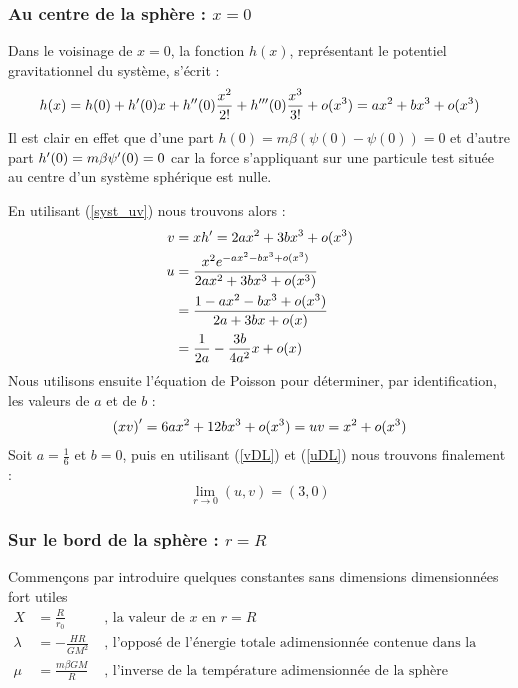 
\subsubsection{Au centre de la sphère : $x = 0$}
	Dans le voisinage de $x=0$, la fonction $h(x)$, représentant le potentiel gravitationnel du système, s'écrit :
	\begin{align*}
		h(x) = h(0) + h'(0)x + h^{\prime\prime}(0)\frac{x^2}{2!} + h^{\prime\prime\prime}(0)\frac{x^3}{3!} + o(x^3) = ax^2 + bx^3 + o(x^3)
	\end{align*}
	Il est clair en effet que d'une part \mbox{$h(0) = m\beta\left(\psi(0) - \psi(0)\right) = 0$} et d'autre part \mbox{$h'(0) = m\beta\psi'(0) = 0$} car la force s'appliquant sur une particule test située au centre d'un système sphérique est nulle.

	En utilisant (\ref{syst_uv}) nous trouvons alors :
	\begin{align}
		v &= xh' = 2ax^2 + 3bx^3 + o(x^3)\label{vDL} \\
		u &= \frac{x^2e^{-ax^2 - bx^3 + o(x^3)}}{2ax^2 + 3bx^3 + o(x^3)} \\
		  &= \frac{1 - ax^2 - bx^3 + o(x^3)}{2a + 3bx +o(x)} \\
		  &= \frac{1}{2a} - \frac{3b}{4a^2}x + o(x)\label{uDL}
	\end{align}
	Nous utilisons ensuite l'équation de Poisson pour déterminer, par identification, les valeurs de $a$ et de $b$ :
	\begin{align}
		\left(xv\right)' = 6ax^2 + 12bx^3 + o(x^3) = uv = x^2 + o(x^3)\label{PoisDL}
	\end{align}
	Soit $a = \frac{1}{6}$ et $b=0$, puis en utilisant (\ref{vDL}) et (\ref{uDL}) nous trouvons finalement :
	$$\lim_{r\to 0}(u,v) = (3,0)$$

\subsubsection{Sur le bord de la sphère : $r = R$}
	Commençons par introduire quelques constantes sans dimensions dimensionnées fort utiles 
	\begin{align}
		X &= \frac{R}{r_0}\;   &\textrm{, la valeur de }x\textrm{ en }r=R \\
		\lambda &= - \frac{H R}{G M^2}\;   &\textrm{, l'opposé de l'énergie totale adimensionnée contenue dans la sphère}\\
		\mu &= \frac{m\beta GM}{R}\;    &\textrm{, l'inverse de la température adimensionnée de la sphère}
	\end{align}
	
